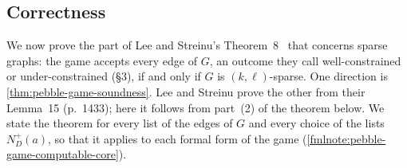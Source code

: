 \subsection{Correctness}
\label{sec:pebble-game-correctness}

We now prove the part of Lee and Streinu's
Theorem~8~\cite[p.~1431]{leeStreinu2008} that concerns sparse graphs:
the game accepts every edge of $G$, an outcome they call
well-constrained or under-constrained (\S 3), if and only if $G$ is
$(k, \ell)$-sparse. One direction is \cref{thm:pebble-game-soundness}.
Lee and Streinu prove the other from their Lemma~15 (p.~1433); here it
follows from part~(2) of the theorem below. We state the theorem for
every list of the edges of $G$ and every choice of the lists
$N^+_D(a)$, so that it applies to each formal form of the game
(\cref{fmlnote:pebble-game-computable-core}).

